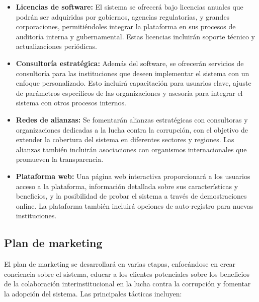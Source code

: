 \documentclass[a4paper,12pt]{article}
\begin{document}
\begin{itemize}
    \item \textbf{Licencias de software:} El sistema se ofrecerá bajo licencias anuales que podrán ser adquiridas por gobiernos, agencias regulatorias, y grandes corporaciones, permitiéndoles integrar la plataforma en sus procesos de auditoría interna y gubernamental. Estas licencias incluirán soporte técnico y actualizaciones periódicas.
    \item \textbf{Consultoría estratégica:} Además del software, se ofrecerán servicios de consultoría para las instituciones que deseen implementar el sistema con un enfoque personalizado. Esto incluirá capacitación para usuarios clave, ajuste de parámetros específicos de las organizaciones y asesoría para integrar el sistema con otros procesos internos.
    \item \textbf{Redes de alianzas:} Se fomentarán alianzas estratégicas con consultoras y organizaciones dedicadas a la lucha contra la corrupción, con el objetivo de extender la cobertura del sistema en diferentes sectores y regiones. Las alianzas también incluirán asociaciones con organismos internacionales que promueven la transparencia.
    \item \textbf{Plataforma web:} Una página web interactiva proporcionará a los usuarios acceso a la plataforma, información detallada sobre sus características y beneficios, y la posibilidad de probar el sistema a través de demostraciones online. La plataforma también incluirá opciones de auto-registro para nuevas instituciones.
\end{itemize}

\subsection{Plan de marketing}
El plan de marketing se desarrollará en varias etapas, enfocándose en crear conciencia sobre el sistema, educar a los clientes potenciales sobre los beneficios de la colaboración interinstitucional en la lucha contra la corrupción y fomentar la adopción del sistema. Las principales tácticas incluyen:
\end{document}

